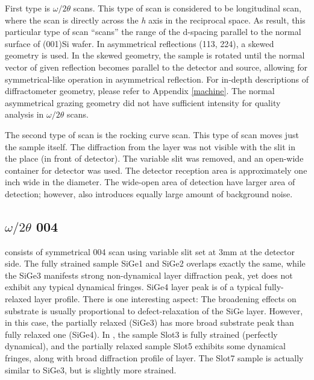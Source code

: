 

First type is $\omega/2\theta$ scans.  This type of scan is considered to be longitudinal scan, where the scan is directly across the \emph{h} axis in the reciprocal space.  As result, this particular type of scan ``scans'' the range of the d-spacing parallel to the normal surface of (001)Si wafer.  In asymmetrical reflections (113, 224), a skewed geometry is used.  In the skewed geometry, the sample is rotated until the normal vector of given reflection becomes parallel to the detector and source, allowing for symmetrical-like operation in asymmetrical reflection.  For in-depth descriptions of diffractometer geometry, please refer to Appendix \ref{machine}.  The normal asymmetrical grazing geometry did not have sufficient intensity for quality analysis in $\omega/2\theta$ scans.

The second type of scan is the rocking curve scan.  This type of scan moves just the sample itself.  The diffraction from the layer was not visible with the slit in the place (in front of detector).  The variable slit was removed, and an open-wide container for detector was used.  The detector reception area is approximately one inch wide in the diameter.  The wide-open area of detection have larger area of detection; however, also introduces equally large amount of background noise.  


\subsection{$\omega/2\theta$ 004}
 consists of symmetrical 004 scan using variable slit set at 3mm at the detector side.  The fully strained sample SiGe1 and SiGe2 overlaps exactly the same, while the SiGe3 manifests strong non-dynamical layer diffraction peak, yet does not exhibit any typical dynamical fringes.  SiGe4 layer peak is of a typical fully-relaxed layer profile.  There is one interesting aspect:  The broadening effects on substrate is usually proportional to  defect-relaxation of the SiGe layer.  However, in this case, the partially relaxed (SiGe3) has more broad substrate peak than fully relaxed one (SiGe4). In , the sample Slot3 is fully strained (perfectly dynamical), and the partially relaxed sample Slot5 exhibits some dynamical fringes, along with broad diffraction profile of layer.  The Slot7 sample is actually similar to SiGe3, but is slightly more strained.

